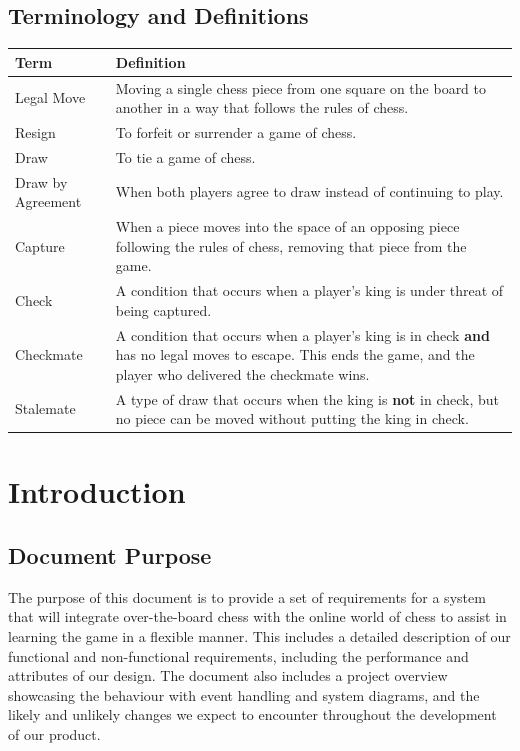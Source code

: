 \documentclass[12pt]{article}
\begin{document}
\subsection{Terminology and Definitions}
\begin{tabularx}{\linewidth}{ l X }
    \toprule		
    \textbf{Term} & \textbf{Definition}\\
    \midrule 
    Legal Move & Moving a single chess piece from one square on the board to another in a way that follows the rules of chess. \\[0.5cm]
    Resign & To forfeit or surrender a game of chess. \\[0.5cm]
    Draw & To tie a game of chess. \\[0.5cm]
    Draw by Agreement & When both players agree to draw instead of continuing to play. \\[0.5cm]
    Capture & When a piece moves into the space of an opposing piece following the rules of chess, removing that piece from the game. \\[0.5cm]
    Check & A condition that occurs when a player's king is under threat of being captured. \\[0.5cm]
    Checkmate & A condition that occurs when a player's king is in check \textbf{and} has no legal moves to escape. 
    This ends the game, and the player who delivered the checkmate wins. \\[0.5cm]
    Stalemate & A type of draw that occurs when the king is \textbf{not} in check, but no piece can be moved without putting the king in check. \\[0.5cm]
    \bottomrule
  \end{tabularx}

\newpage

\section{Introduction}
\subsection{Document Purpose}
The purpose of this document is to provide a set of requirements for a system that will integrate over-the-board chess with the online world of chess to assist in learning the game in a flexible manner.
This includes a detailed description of our functional and non-functional requirements, including the performance and attributes of our design. 
The document also includes a project overview showcasing the behaviour with event handling and system diagrams, and the likely and unlikely changes we expect to 
encounter throughout the development of our product.
\end{document}
